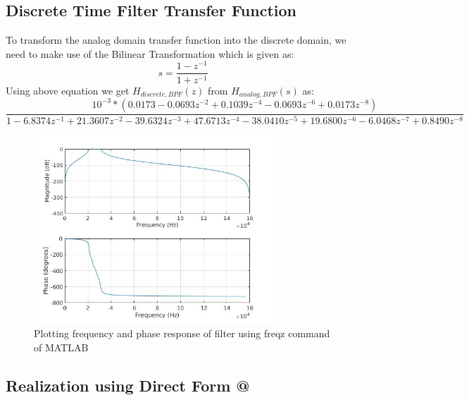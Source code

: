\documentclass[12pt]{article}
\makeatletter
\newcommand{\Rmnum}[1]{\expandafter\@slowromancap\romannumeral #1@}
\makeatother
\begin{document}
\subsection{Discrete Time Filter Transfer Function}
To transform the analog domain transfer function into the discrete domain, we need to make use of the Bilinear Transformation which is given as:
\begin{equation*}
s = \frac{1-z^{-1}}{1+z^{-1}}
\end{equation*}
Using above equation we get $H_{discrete,BPF}(z)$ from  $H_{analog,BPF}(s)$ as:
\begin{equation*}
\frac{ 10^{-3}*(0.0173-0.0693z^{-2}+0.1039z^{-4}-0.0693z^{-6}+ 0.0173z^{-8})}{1-6.8374z^{-1}+21.3607z^{-2}-39.6324z^{-3}+47.6713z^{-4}-38.0410z^{-5}+19.6800z^{-6}-6.0468z^{-7}+0.8490z^{-8}}
\end{equation*} 
\begin{figure}[h!]
	\centering	
	\includegraphics[width = 0.8\textwidth]{matlab_filter1.jpg}
    \caption{Plotting frequency and phase response of filter using freqz command of MATLAB}
\end{figure}
\newpage
\subsection{Realization using Direct Form \Rmnum{2}}
\end{document}
